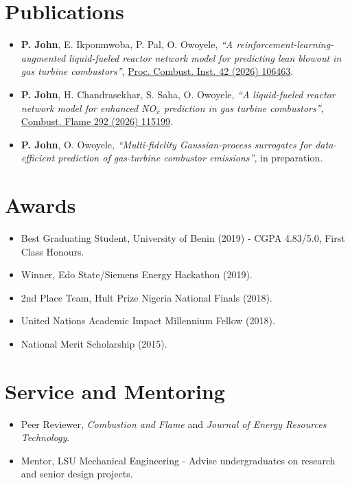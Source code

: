 \documentclass[letterpaper,10pt]{article}
\begin{document}
\section{Publications}
\begin{itemize}
  \item \textbf{P. John}, E. Ikponmwoba, P. Pal, O. Owoyele, \textit{``A reinforcement-learning-augmented liquid-fueled reactor
        network model for predicting lean blowout in gas turbine combustors''},
        \href{https://doi.org/10.1016/j.proci.2026.106463}{Proc. Combust. Inst. 42 (2026) 106463}.
  \item \textbf{P. John}, H. Chandrasekhar, S. Saha, O. Owoyele, \textit{``A liquid-fueled reactor network model for enhanced
        NO$_x$ prediction in gas turbine combustors''},
        \href{https://doi.org/10.1016/j.combustflame.2026.115199}{Combust. Flame 292 (2026) 115199}.
  \item \textbf{P. John}, O. Owoyele, \textit{``Multi-fidelity Gaussian-process surrogates for data-efficient prediction of
        gas-turbine combustor emissions''}, in preparation.
\end{itemize}

\section{Awards}
\begin{itemize}
  \item Best Graduating Student, University of Benin (2019) - CGPA 4.83/5.0, First Class Honours.
  \item Winner, Edo State/Siemens Energy Hackathon (2019).
  \item 2nd Place Team, Hult Prize Nigeria National Finals (2018).
  \item United Nations Academic Impact Millennium Fellow (2018).
  \item National Merit Scholarship (2015).
\end{itemize}

\section{Service and Mentoring}
\begin{itemize}
  \item Peer Reviewer, \textit{Combustion and Flame} and \textit{Journal of Energy Resources Technology}.
  \item Mentor, LSU Mechanical Engineering - Advise undergraduates on research and senior design projects.
\end{itemize}
\end{document}
